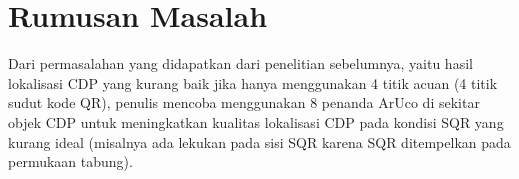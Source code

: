 

\section{Rumusan Masalah}
Dari permasalahan yang didapatkan dari penelitian sebelumnya, yaitu hasil lokalisasi CDP yang kurang baik jika hanya menggunakan 4 titik acuan (4 titik sudut
kode QR), penulis mencoba menggunakan 8 penanda ArUco \cite{arucoopencv} di sekitar objek CDP untuk meningkatkan kualitas lokalisasi CDP pada kondisi SQR yang kurang ideal
(misalnya ada lekukan pada sisi SQR karena SQR ditempelkan pada permukaan tabung).

